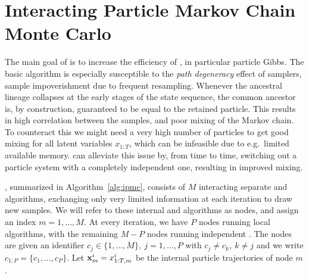 
\section{Interacting Particle Markov Chain Monte Carlo}
\label{sec:method}

The main goal of \ipmcmc is to increase the efficiency of \pmcmc, in particular particle Gibbs. The basic \pg algorithm is especially susceptible to the \emph{path degeneracy} effect of \smc samplers, \ie sample impoverishment due to frequent resampling.  Whenever the ancestral lineage collapses at the early stages of the state sequence, the common ancestor is, by construction, guaranteed to be equal to the retained particle.  This results in high correlation between the samples, and poor mixing of the Markov chain. %
To counteract this we might need a very high number of particles to get good mixing for all latent variables $x_{1:T}$, which can be infeasible due to e.g.~limited available memory. \ipmc can alleviate this issue by, from time to time, switching out a \csmc particle system with a completely independent \smc one, resulting in improved mixing.

\ipmcmc, summarized in Algorithm~\ref{alg:ipmc}, consists of $M$ interacting separate \csmc and \smc algorithms, exchanging only very limited information at each iteration to draw new \mcmc samples. We will refer to these internal \csmc and \smc algorithms as nodes, and assign an index $m=1,\ldots,M$. 
At every iteration, we have $P$ nodes running local \csmc algorithms, with the remaining
$M-P$ nodes running independent \smc.
The \csmc nodes are given an identifier $c_j \in \{1,\ldots,M\}, ~j=1,\ldots,P$ with $c_j \neq c_k,~k \neq j$ and we write $c_{1:P} = \{c_1,\ldots,c_P\}$. Let $\mathbf{x}_m^i = x_{1:T,m}^i$ be the internal particle trajectories of node $m$.

